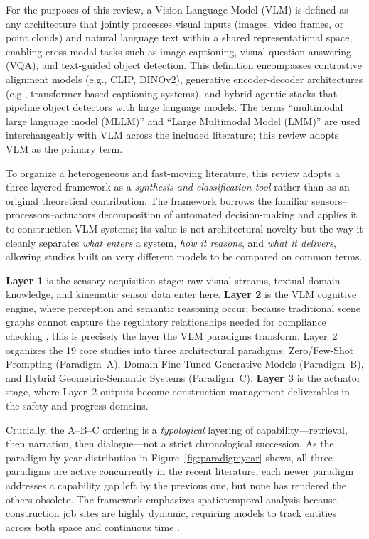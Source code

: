 \documentclass[10pt,letterpaper]{article}
\begin{document}
For the purposes of this review, a Vision-Language Model (VLM) is defined as any architecture that jointly processes visual inputs (images, video frames, or point clouds) and natural language text within a shared representational space, enabling cross-modal tasks such as image captioning, visual question answering (VQA), and text-guided object detection. This definition encompasses contrastive alignment models (e.g., CLIP, DINOv2), generative encoder-decoder architectures (e.g., transformer-based captioning systems), and hybrid agentic stacks that pipeline object detectors with large language models. The terms ``multimodal large language model (MLLM)'' and ``Large Multimodal Model (LMM)'' are used interchangeably with VLM across the included literature; this review adopts VLM as the primary term.

To organize a heterogeneous and fast-moving literature, this review adopts a three-layered framework as a \emph{synthesis and classification tool} rather than as an original theoretical contribution. The framework borrows the familiar sensors--processors--actuators decomposition of automated decision-making \cite{parasuraman2000} and applies it to construction VLM systems; its value is not architectural novelty but the way it cleanly separates \emph{what enters} a system, \emph{how it reasons}, and \emph{what it delivers}, allowing studies built on very different models to be compared on common terms.

\textbf{Layer 1} is the sensory acquisition stage: raw visual streams, textual domain knowledge, and kinematic sensor data enter here. \textbf{Layer 2} is the VLM cognitive engine, where perception and semantic reasoning occur; because traditional scene graphs cannot capture the regulatory relationships needed for compliance checking \cite{wang2023}, this is precisely the layer the VLM paradigms transform. Layer~2 organizes the 19 core studies into three architectural paradigms: Zero/Few-Shot Prompting (Paradigm~A), Domain Fine-Tuned Generative Models (Paradigm~B), and Hybrid Geometric-Semantic Systems (Paradigm~C). \textbf{Layer 3} is the actuator stage, where Layer~2 outputs become construction management deliverables in the safety and progress domains.

Crucially, the A--B--C ordering is a \emph{typological} layering of capability---retrieval, then narration, then dialogue---not a strict chronological succession. As the paradigm-by-year distribution in Figure~\ref{fig:paradigmyear} shows, all three paradigms are active concurrently in the recent literature; each newer paradigm addresses a capability gap left by the previous one, but none has rendered the others obsolete. The framework emphasizes spatiotemporal analysis because construction job sites are highly dynamic, requiring models to track entities across both space and continuous time \cite{li2025}.
\end{document}
